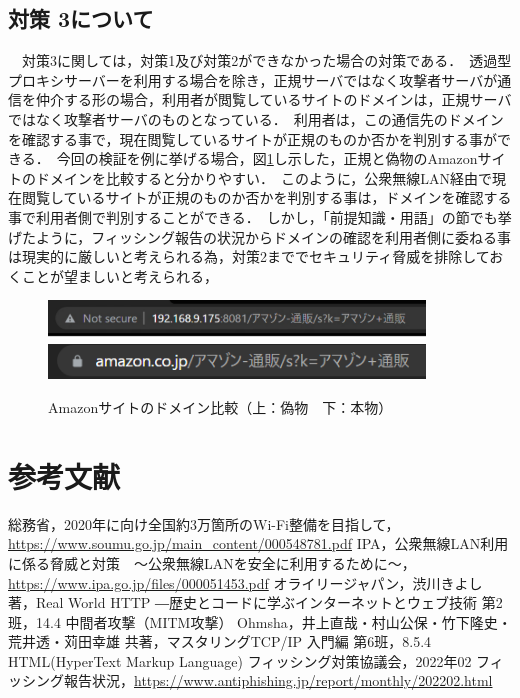 \documentclass[dvipdfmx]{jsarticle}
\begin{document}
            \subsection{対策 3について}
                　対策3に関しては，対策1及び対策2ができなかった場合の対策である．\
                透過型プロキシサーバーを利用する場合を除き，正規サーバではなく攻撃者サーバが通信を仲介する形の場合，利用者が閲覧しているサイトのドメインは，正規サーバではなく攻撃者サーバのものとなっている．\
                利用者は，この通信先のドメインを確認する事で，現在閲覧しているサイトが正規のものか否かを判別する事ができる．\
                今回の検証を例に挙げる場合，図\ref{compare-amazon-domain}し示した，正規と偽物のAmazonサイトのドメインを比較すると分かりやすい．\
                このように，公衆無線LAN経由で現在閲覧しているサイトが正規のものか否かを判別する事は，ドメインを確認する事で利用者側で判別することができる．\
                しかし，「前提知識・用語」の節でも挙げたように，フィッシング報告の状況からドメインの確認を利用者側に委ねる事は現実的に厳しいと考えられる為，対策2まででセキュリティ脅威を排除しておくことが望ましいと考えられる，\
                \begin{figure}[pth]
                    \centering
                    \includegraphics[width=10cm]{img/measure-domain-00.png}
                    \includegraphics[width=10cm]{img/measure-domain-01.png}
                    \caption{Amazonサイトのドメイン比較（上：偽物　下：本物）}
                    \label{compare-amazon-domain}
                \end{figure}
        \section{参考文献}
            \begin{thebibliography}{9}
                \bibitem{SoumuWiFi} 総務省，2020年に向け全国約3万箇所のWi-Fi整備を目指して，\url{https://www.soumu.go.jp/main_content/000548781.pdf}
                \bibitem{IPA} IPA，公衆無線LAN利用に係る脅威と対策　～公衆無線LANを安全に利用するために～，\url{https://www.ipa.go.jp/files/000051453.pdf}
                \bibitem{AboutMITM} オライリージャパン，渋川きよし 著，Real World HTTP ―歴史とコードに学ぶインターネットとウェブ技術 第2班，14.4 中間者攻撃（MITM攻撃）
                 Ohmsha，井上直哉・村山公保・竹下隆史・荒井透・苅田幸雄 共著，マスタリングTCP/IP 入門編 第6班，8.5.4 HTML(HyperText Markup Language)
                 フィッシング対策協議会，2022年02 フィッシング報告状況，\url{https://www.antiphishing.jp/report/monthly/202202.html}
            \end{thebibliography}
        
\end{document}

